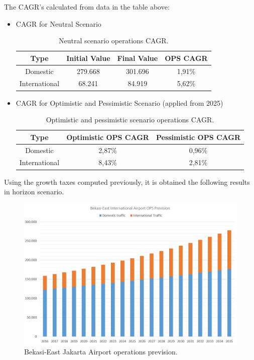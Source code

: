 The CAGR's calculated from  data in the table above:
	\begin{itemize}
		\item CAGR for Neutral Scenario
		
\begin{table}[H]
	\label{table:CAGRNeutralOPS}
	\centering
\begin{tabular}{|c|c|c|c|}
	\hline 
	\textbf{Type} & \textbf{Initial Value} & \textbf{Final Value} & \textbf{OPS CAGR}\tabularnewline
	\hline 
	Domestic & 279.668  & 301.696  & 1,91\% \tabularnewline
	\hline 
	International & 68.241  & 84.919  & 5,62\% \tabularnewline
	\hline 
\end{tabular}
	\caption{Neutral scenario operations CAGR.}
\end{table}
		
		\item CAGR for Optimistic and Pessimistic Scenario (applied from 2025)
		
\begin{table}[H]
			\label{table:CAGROPTPESOPS}
			\centering
	\begin{tabular}{|c|c|c|}
		\hline 
		\textbf{Type} & \textbf{Optimistic OPS CAGR} & \textbf{Pessimistic OPS CAGR}\tabularnewline
		\hline  
		Domestic & 2,87\%  & 0,96\% \tabularnewline
		\hline 
		International & 8,43\%  & 2,81\% \tabularnewline
		\hline 
\end{tabular}
			\caption{Optimistic and pessimistic scenario operations CAGR.}
		\end{table}
		
	\end{itemize}
	
Using the growth taxes computed previously, it is obtained the following results in horizon scenario.
	
\begin{figure}[H]
	\centering
	\includegraphics[clip, trim=0cm 0cm 0cm 0cm, width=1\textwidth]{./images/PROGNOSIS/TrafficForecast/BE_OPS_Prev}
	\caption{Bekasi-East Jakarta Airport operations prevision.}
	\label{BE_OPS_Prev}
\end{figure}

